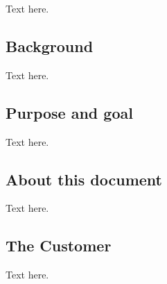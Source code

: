 Text here.

\subsection{Background}
Text here.

\subsection{Purpose and goal}
Text here.

\subsection{About this document}
Text here.

\subsection{The Customer}
Text here.


